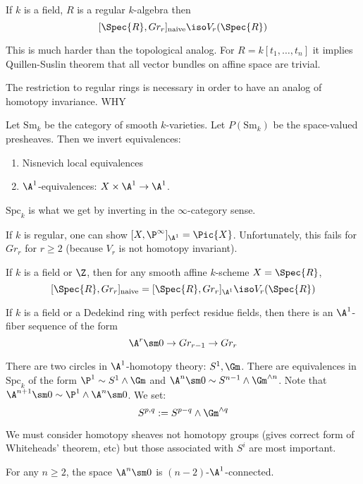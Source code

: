 \documentclass{article}
\newcommand{\Sm}{\mathrm{Sm}}
\newcommand{\Spc}{\mathrm{Spc}}
\begin{document}
\begin{theorem}
If $k$ is a field, $R$ is a regular $k$-algebra then
\[ [\Spec{R}, Gr_r]_{\text{naive}} \iso V_r(\Spec{R}) \] 
\end{theorem}

This is much harder than the topological analog. For $R = k[t_1, \dots, t_n]$ it implies Quillen-Suslin theorem that all vector bundles on affine space are trivial.

The restriction to regular rings is necessary in order to have an analog of homotopy invariance. {\color{red} WHY}

Let $\Sm_k$ be the category of smooth $k$-varieties. Let $P(\Sm_k)$ be the space-valued presheaves. Then we invert equivalences:
\begin{enumerate}
\item Nisnevich local equivalences
\item $\A^1$-equivalences: $X \times \A^1 \to \A^1$.
\end{enumerate}

$\Spc_k$ is what we get by inverting in the $\infty$-category sense. 

If $k$ is regular, one can show $[X, \P^\infty]_{\A^1} = \Pic{X}$. Unfortunately, this fails for $Gr_r$ for $r \ge 2$ (because $V_r$ is not homotopy invariant).

\begin{theorem}
If $k$ is a field or $\Z$, then for any smooth affine $k$-scheme $X = \Spec{R}$,
\[ [\Spec{R}, Gr_r]_{\text{naive}} = [\Spec{R}, Gr_r]_{\A^1} \iso V_r(\Spec{R}) \]
\end{theorem}

\begin{theorem}
If $k$ is a field or a Dedekind ring with perfect residue fields, then there is an $\A^1$-fiber sequence of the form
\[ \A^r \sm 0 \to Gr_{r-1} \to Gr_r \]
\end{theorem}

There are two circles in $\A^1$-homotopy theory: $S^1, \Gm$. There are equivalences in $\Spc_k$ of the form $\P^1 \sim S^1 \wedge \Gm$ and $\A^n \sm 0 \sim S^{n-1} \wedge \Gm^{\wedge n}$.  Note that $\A^{n+1} \sm 0 \sim \P^1 \wedge \A^n \sm 0$.
We set:
\[ S^{p,q} := S^{p-q} \wedge \Gm^{\wedge q} \]

We must consider homotopy  sheaves not homotopy groups (gives correct form of Whiteheads' theorem, etc) but those associated with $S^i$ are most important.

\begin{theorem}[Morel]
For any $n \ge 2$, the space $\A^n \sm 0$ is $(n-2)$-$\A^1$-connected. 
\end{theorem}
\end{document}
